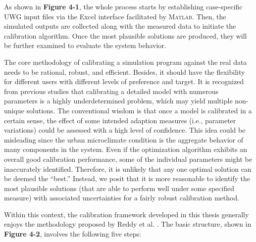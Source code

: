 As shown in \textbf{Figure 4-1}, the whole process starts by establishing case-specific UWG input files via the Excel interface facilitated by \textsc{Matlab}. Then, the simulated outputs are collected along with the measured data to initiate the calibration algorithm. Once the most plausible solutions are produced, they will be further examined to evaluate the system behavior.

The core methodology of calibrating a simulation program against the real data needs to be rational, robust, and efficient. Besides, it should have the flexibility for different users with different levels of preference and target. It is recognized from previous studies \cite{saltelli2002sensitivity,oliva2003model} that calibrating a detailed model with numerous parameters is a highly underdetermined problem, which may yield multiple non-unique solutions. The conventional wisdom is that once a model is calibrated in a certain sense, the effect of some intended adaption measures (i.e., parameter variations) could be assessed with a high level of confidence. This idea could be misleading since the urban microclimate condition is the aggregate behavior of many components in the system. Even if the optimization algorithm exhibits an overall good calibration performance, some of the individual parameters might be inaccurately identified. Therefore, it is unlikely that any one optimal solution can be deemed the ``best.'' Instead, we posit that it is more reasonable to identify the most plausible solutions (that are able to perform well under some specified measure) with associated uncertainties for a fairly robust calibration method.

Within this context, the calibration framework developed in this thesis generally enjoys the methodology proposed by Reddy et al. \cite{sun2006calibration,reddy2007calibrating}. The basic structure, shown in \textbf{Figure 4-2}, involves the following five steps:

